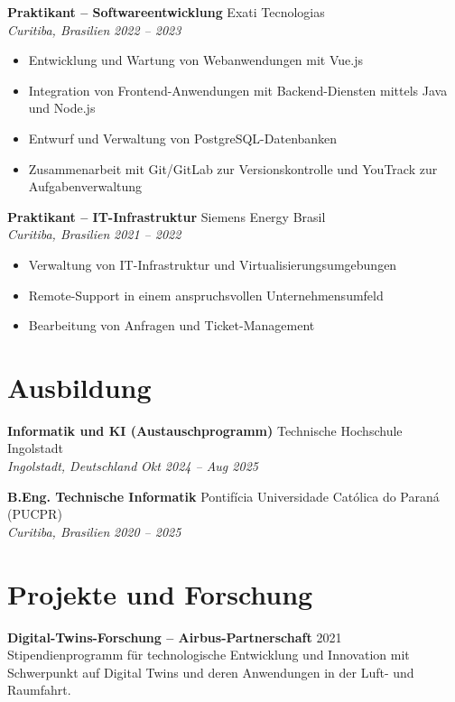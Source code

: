 \documentclass[11pt,a4paper]{article}
\newcommand{\entry}[4]{
    \textbf{#1} \hfill #2 \\
    \textit{#3} \hfill \textit{#4}
}
\begin{document}
\vspace{3pt}

\entry{Praktikant -- Softwareentwicklung}{Exati Tecnologias}{Curitiba, Brasilien}{2022 -- 2023}
\begin{itemize}[nosep, leftmargin=*]
    \item Entwicklung und Wartung von Webanwendungen mit Vue.js
    \item Integration von Frontend-Anwendungen mit Backend-Diensten mittels Java und Node.js
    \item Entwurf und Verwaltung von PostgreSQL-Datenbanken
    \item Zusammenarbeit mit Git/GitLab zur Versionskontrolle und YouTrack zur Aufgabenverwaltung
\end{itemize}

\vspace{3pt}

\entry{Praktikant -- IT-Infrastruktur}{Siemens Energy Brasil}{Curitiba, Brasilien}{2021 -- 2022}
\begin{itemize}[nosep, leftmargin=*]
    \item Verwaltung von IT-Infrastruktur und Virtualisierungsumgebungen
    \item Remote-Support in einem anspruchsvollen Unternehmensumfeld
    \item Bearbeitung von Anfragen und Ticket-Management
\end{itemize}

\section{Ausbildung}

\entry{Informatik und KI (Austauschprogramm)}{Technische Hochschule Ingolstadt}{Ingolstadt, Deutschland}{Okt 2024 -- Aug 2025}

\vspace{3pt}

\entry{B.Eng. Technische Informatik}{Pontifícia Universidade Católica do Paraná (PUCPR)}{Curitiba, Brasilien}{2020 -- 2025}

\section{Projekte und Forschung}

\textbf{Digital-Twins-Forschung -- Airbus-Partnerschaft} \hfill 2021 \\
Stipendienprogramm für technologische Entwicklung und Innovation mit Schwerpunkt auf Digital Twins und deren Anwendungen in der Luft- und Raumfahrt.
\end{document}
